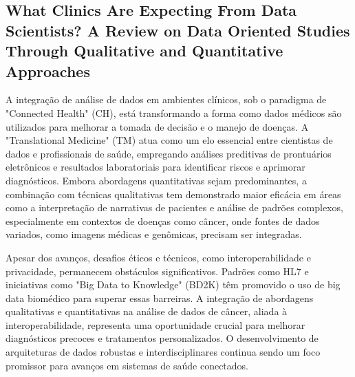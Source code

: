 \subsection{What Clinics Are Expecting From Data Scientists? A Review on Data Oriented Studies Through Qualitative and Quantitative Approaches}
A integração de análise de dados em ambientes clínicos, sob o paradigma de "Connected Health" (CH), está transformando a forma como dados 
médicos são utilizados para melhorar a tomada de decisão e o manejo de doenças. A "Translational Medicine" (TM) atua como um elo essencial 
entre cientistas de dados e profissionais de saúde, empregando análises preditivas de prontuários eletrônicos e resultados laboratoriais 
para identificar riscos e aprimorar diagnósticos. Embora abordagens quantitativas sejam predominantes, a combinação com técnicas qualitativas 
tem demonstrado maior eficácia em áreas como a interpretação de narrativas de pacientes e análise de padrões complexos, especialmente em 
contextos de doenças como câncer, onde fontes de dados variados, como imagens médicas e genômicas, precisam ser integradas. \cite{xu2019clinics}

Apesar dos avanços, desafios éticos e técnicos, como interoperabilidade e privacidade, permanecem obstáculos significativos. Padrões como HL7
 e iniciativas como "Big Data to Knowledge" (BD2K) têm promovido o uso de big data biomédico para superar essas barreiras. A integração de 
 abordagens qualitativas e quantitativas na análise de dados de câncer, aliada à interoperabilidade, representa uma oportunidade crucial para 
 melhorar diagnósticos precoces e tratamentos personalizados. O desenvolvimento de arquiteturas de dados robustas e interdisciplinares continua 
 sendo um foco promissor para avanços em sistemas de saúde conectados. \cite{xu2019clinics}